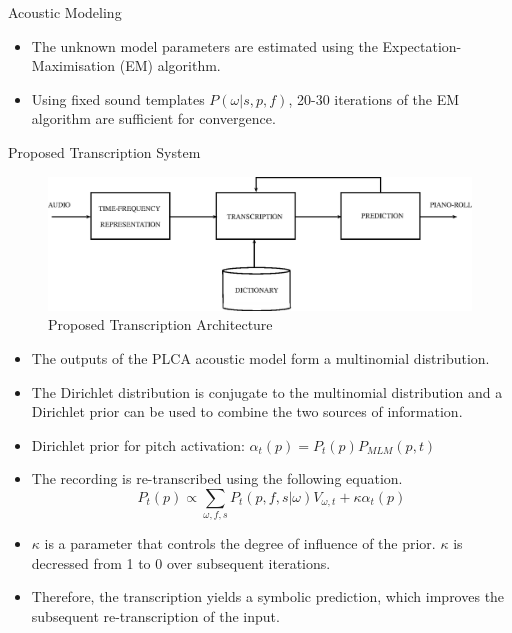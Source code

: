 \documentclass[final]{beamer}
\newlength{\onecolwid}
\newlength{\twocolwid}
\begin{document}
\begin{frame}[t]
\begin{columns}[t]
\begin{column}{\twocolwid}
\begin{columns}[t,totalwidth=\twocolwid]
\begin{column}{\onecolwid}
\begin{block}{Acoustic Modeling}
\begin{itemize}
\item The unknown model parameters are estimated using the Expectation-Maximisation (EM) algorithm.
\item Using fixed sound templates $P(\omega|s,p,f)$, 20-30 iterations of the EM algorithm are sufficient for convergence. 
\end{itemize}

\end{block}

\begin{block}{Proposed Transcription System}
\begin{figure}
\includegraphics[width=0.9\linewidth]{FigSystem.eps}
\caption{Proposed Transcription Architecture}
\end{figure}

\begin{itemize}
\item The outputs of the PLCA acoustic model form a multinomial distribution. 
\item The Dirichlet distribution is conjugate to the multinomial distribution and a Dirichlet prior can be used to combine the two sources of information.
\item Dirichlet prior for pitch activation: $\alpha_t(p) = P_t(p)P_{MLM}(p,t)$
\item The recording is re-transcribed using the following equation.
\begin{equation}
 P_{t}(p) \propto \sum_{\omega,f,s}P_{t}(p,f,s|\omega)V_{\omega,t}+\kappa\alpha_{t}(p) \label{eq:modifiedMStepPitchActivation} 
\end{equation}
\item $\kappa$ is a parameter that controls the degree of influence of the prior. $\kappa$ is decressed from 1 to 0 over subsequent iterations.
\item Therefore, the transcription yields a symbolic prediction, which improves the subsequent re-transcription of the input. 
\end{itemize}
\end{block}
\end{column} %


\end{columns}
\end{column}
\end{columns}
\end{frame}
\end{document}
